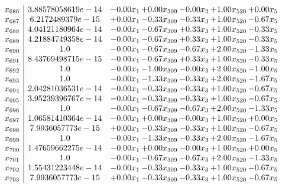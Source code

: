 \documentclass[8pt]{article}
\begin{document}
\[\begin{array}{c| c c@{\hskip 2pt} c@{\hskip 2pt} c@{\hskip 2pt} c@{\hskip 2pt} c@{\hskip 2pt} }
 x_{686}   &  3.88578058619e-14 & -0.00 x_{1} & +  0.00 x_{309} & -0.00 x_{3} & +  1.00 x_{520} & +  0.00 x_{5}\\
 x_{687}   &  6.2172489379e-15 & +  0.00 x_{1} & -0.33 x_{309} & -0.33 x_{3} & +  1.00 x_{520} & -0.67 x_{5}\\
 x_{688}   &  4.04121180964e-14 & -0.00 x_{1} & -0.67 x_{309} & +  0.33 x_{3} & +  1.00 x_{520} & -0.33 x_{5}\\
 x_{689}   &  4.21884749358e-14 & -0.00 x_{1} & -0.67 x_{309} & +  0.33 x_{3} & +  1.00 x_{520} & -0.33 x_{5}\\
 x_{690}   &  1.0 & -0.00 x_{1} & -0.67 x_{309} & -0.67 x_{3} & +  2.00 x_{520} & -1.33 x_{5}\\
 x_{691}   &  8.43769498715e-15 & -0.00 x_{1} & -0.67 x_{309} & +  0.33 x_{3} & +  1.00 x_{520} & -0.33 x_{5}\\
 x_{692}   &  1.0 & -0.00 x_{1} & -1.00 x_{309} & -0.00 x_{3} & +  2.00 x_{520} & -1.00 x_{5}\\
 x_{693}   &  1.0 & -0.00 x_{1} & -1.33 x_{309} & -0.33 x_{3} & +  2.00 x_{520} & -1.67 x_{5}\\
 x_{694}   &  2.04281036531e-14 & -0.00 x_{1} & -0.33 x_{309} & -0.33 x_{3} & +  1.00 x_{520} & -0.67 x_{5}\\
 x_{695}   &  3.95239396767e-14 & -0.00 x_{1} & -0.33 x_{309} & -0.33 x_{3} & +  1.00 x_{520} & -0.67 x_{5}\\
 x_{696}   &  1.0 & -0.00 x_{1} & -0.67 x_{309} & -0.67 x_{3} & +  2.00 x_{520} & -1.33 x_{5}\\
 x_{697}   &  1.06581410364e-14 & -0.00 x_{1} & +  0.00 x_{309} & -0.00 x_{3} & +  1.00 x_{520} & +  0.00 x_{5}\\
 x_{698}   &  7.9936057773e-15 & +  0.00 x_{1} & -0.33 x_{309} & -0.33 x_{3} & +  1.00 x_{520} & -0.67 x_{5}\\
 x_{699}   &  1.0 & -0.00 x_{1} & -1.33 x_{309} & -0.33 x_{3} & +  2.00 x_{520} & -1.67 x_{5}\\
 x_{700}   &  1.47659662275e-14 & -0.00 x_{1} & +  0.00 x_{309} & -0.00 x_{3} & +  1.00 x_{520} & +  0.00 x_{5}\\
 x_{701}   &  1.0 & -0.00 x_{1} & -0.67 x_{309} & -0.67 x_{3} & +  2.00 x_{520} & -1.33 x_{5}\\
 x_{702}   &  1.55431223448e-14 & -0.00 x_{1} & -0.33 x_{309} & -0.33 x_{3} & +  1.00 x_{520} & -0.67 x_{5}\\
 x_{703}   &  7.9936057773e-15 & +  0.00 x_{1} & -0.33 x_{309} & -0.33 x_{3} & +  1.00 x_{520} & -0.67 x_{5}\\

\end{array}\]
\end{document}
